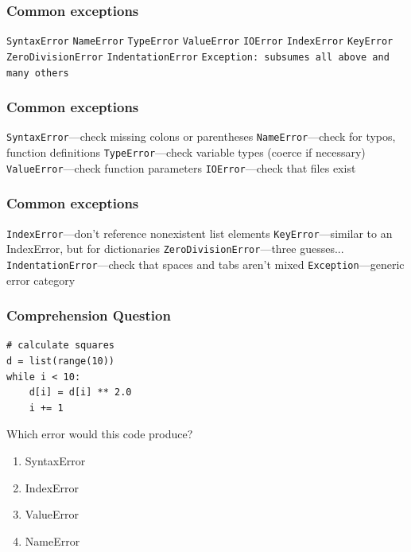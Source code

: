 \documentclass[11pt]{beamer}
\begin{document}
\begin{frame}[fragile]
  \frametitle{Common exceptions}
  \Enlarge

  \begin{enumerate}
  \myitem  \texttt{SyntaxError}
  \myitem  \texttt{NameError}
  \myitem  \texttt{TypeError}
  \myitem  \texttt{ValueError}
  \myitem  \texttt{IOError}
  \myitem  \texttt{IndexError}
  \myitem  \texttt{KeyError}
  \myitem  \texttt{ZeroDivisionError}
  \myitem  \texttt{IndentationError}
  \myitem  \texttt{Exception: subsumes all above and many others}
  \end{enumerate}
\end{frame}

\begin{frame}[fragile]
  \frametitle{Common exceptions}
  \Enlarge

  \begin{enumerate}
  \myitem \texttt{SyntaxError}---check missing colons or parentheses
  \myitem \texttt{NameError}---check for typos, function definitions
  \myitem \texttt{TypeError}---check variable types (coerce if necessary)
  \myitem \texttt{ValueError}---check function parameters
  \myitem \texttt{IOError}---check that files exist
  \end{enumerate}
\end{frame}

\begin{frame}[fragile]
  \frametitle{Common exceptions}
  \Enlarge

  \begin{enumerate}
  \myitem \texttt{IndexError}---don't reference nonexistent list elements
  \myitem \texttt{KeyError}---similar to an IndexError, but for dictionaries
  \myitem  \texttt{ZeroDivisionError}---three guesses...
  \myitem  \texttt{IndentationError}---check that spaces and tabs aren't mixed
  \myitem  \texttt{Exception}---generic error category
  \end{enumerate}
\end{frame}

\begin{frame}[fragile]
  \frametitle{Comprehension Question}
  \Enlarge

  \begin{Verbatim}
# calculate squares
d = list(range(10))
while i < 10:
    d[i] = d[i] ** 2.0
    i += 1
  \end{Verbatim}

  Which error would this code produce?

  \begin{enumerate}[label=\Alph*]
  \item  SyntaxError
  \item  IndexError
  \item  ValueError
  \item  NameError
  \end{enumerate}
\end{frame}
\end{document}
